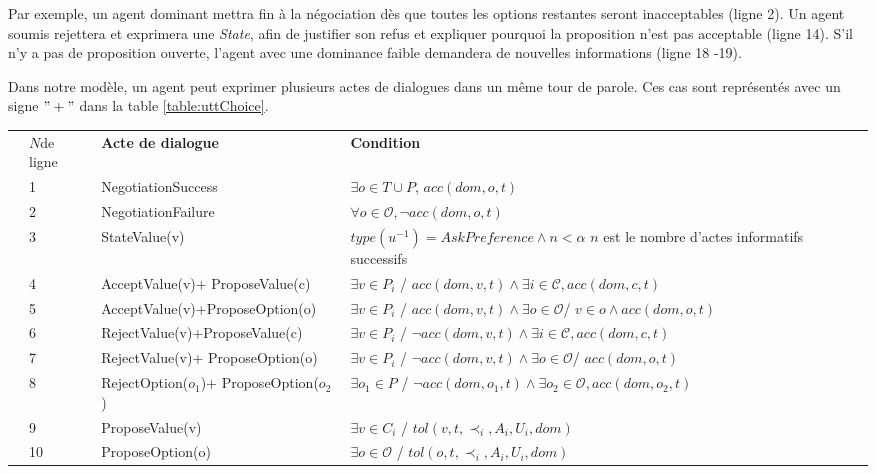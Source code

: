 	
	Par exemple, un agent dominant mettra fin à la négociation dès que toutes les options restantes seront inacceptables (ligne 2). Un agent soumis rejettera et exprimera une \emph{State}, afin de justifier son refus et expliquer pourquoi la proposition n'est pas acceptable (ligne 14). S'il n'y a pas de proposition ouverte, l'agent avec une dominance faible demandera de nouvelles informations (ligne 18 -19).
	
	Dans notre modèle, un agent peut exprimer plusieurs actes de dialogues dans un même tour de parole. Ces cas sont représentés avec un signe $"+"$ dans la table \ref{table:uttChoice}.
	
	\begin{table}[!t]
		
		\centering
		\begin{tabular}{|p{.5cm}|p{.9cm}|p{3.6cm}|p{7.6cm}|}
			\hline
			\parbox[t]{3mm}{}&$N $de ligne& \textbf{Acte de dialogue} & \textbf{Condition} \\
			&1&NegotiationSuccess & $\exists o \in T\cup P$, $acc(dom,o,t)$ \\
			& 2& NegotiationFailure & $ \forall o \in \mathcal{O},  \neg acc(dom,o,t)$\\
			&3& StateValue(v) & $type(u^{-1}) = AskPreference \land n < \alpha$ \newline $n$ est le nombre d'actes informatifs successifs\\
			&4& AcceptValue(v)+ \newline ProposeValue(c) & $ \exists v \in P_i$ / $acc(dom,v,t) \land \exists i\in\mathcal{C}, acc(dom,c,t)$ \\
			&5& AcceptValue(v)+\newline ProposeOption(o) &  $ \exists v \in P_i$ / $ acc(dom,v,t) \land \exists o \in \mathcal{O}$/ $ v \in o \land acc(dom,o,t)$ \\
			&6& RejectValue(v)+\newline ProposeValue(c) & $ \exists v \in P_i$ / $ \neg acc(dom,v,t) \land \exists i\in\mathcal{C}, acc(dom,c,t)$ \\
			&7& RejectValue(v)+ \newline ProposeOption(o) &  $ \exists v \in P_i$ / $  \neg acc(dom,v,t) \land \exists o \in \mathcal{O}$/ $acc(dom,o,t)$ \\
			& 8&RejectOption($o_1$)+ ProposeOption($o_2$) & $ \exists o_1 \in P$ / $ \neg acc(dom,o_1,t) \land \exists o_2\in\mathcal{O}, acc(dom,o_2,t)$ \\
			&9& ProposeValue(v) & $\exists v \in C_i$ / $tol(v, t, \prec_i, A_i, U_i, dom)$\\
			&10& ProposeOption(o) & $\exists o \in \mathcal{O}$ / $tol(o, t, \prec_i, A_i, U_i, dom)$\\
			

\end{tabular}
\end{table}
